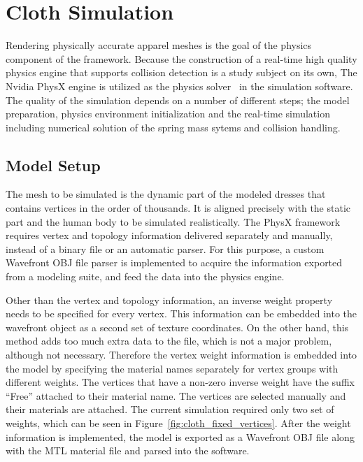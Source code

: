 \chapter{Cloth Simulation}
\label{chapter_cloth_simulation}

Rendering physically accurate apparel meshes is the goal of the physics component of the framework. Because the construction of a real-time high quality physics engine that supports collision detection is a study subject on its own, The Nvidia PhysX engine is utilized as the physics solver~\cite{Kim2011} in the simulation software. The quality of the simulation depends on a number of different steps; the model preparation, physics environment initialization and the real-time simulation including numerical solution of the spring mass sytems and collision handling. 

\section{Model Setup}
The mesh to be simulated is the dynamic part of the modeled dresses that contains vertices in the order of thousands. It is aligned precisely with the static part and the human body to be simulated realistically. The PhysX framework requires vertex and topology information delivered separately and manually, instead of a binary file or an automatic parser. For this purpose, a custom Wavefront OBJ file parser is implemented to acquire the information exported from a modeling suite, and feed the data into the physics engine. 

Other than the vertex and topology information, an inverse weight property needs to be specified for every vertex.  This information can be embedded into the wavefront object as a second set of texture coordinates. On the other hand, this method adds too much extra data to the file, which is not a major problem, although not necessary. Therefore the vertex weight information is embedded into the model by specifying the material names separately for vertex groups with different weights. The vertices that have a non-zero inverse weight have the suffix ``Free'' attached to their material name. The vertices are selected manually and their materials are attached.  The current simulation required only two set of weights, which can be seen in Figure~\ref{fig:cloth_fixed_vertices}. After the weight information is implemented, the model is exported as a Wavefront OBJ file along with the MTL material file and parsed into the software.

